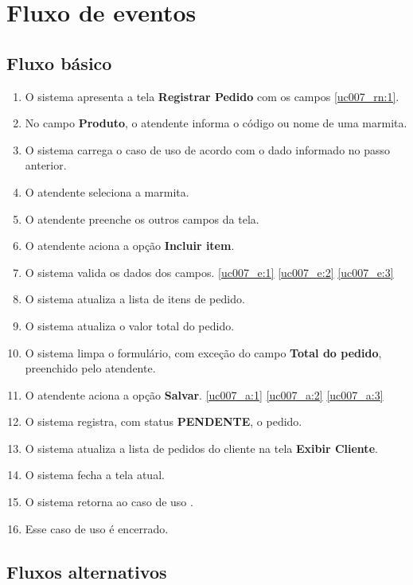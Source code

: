 \section{Fluxo de eventos}

\subsection{Fluxo básico}

\begin{enumerate}[label=P\arabic*]
	\item O sistema apresenta a tela \textbf{Registrar Pedido} com os campos \ref{uc007_rn:1}. \label{uc007_p:1}
	\item No campo \textbf{Produto}, o atendente informa o código ou nome de uma marmita. \label{uc007_p:2}
	\item O sistema carrega o caso de uso  de acordo com o dado informado no passo anterior.
	\item O atendente seleciona a marmita. \label{uc007_p:4}
	\item O atendente preenche os outros campos da tela. \label{uc007_p:5}	
	\item O atendente aciona a opção \textbf{Incluir item}.
	\item O sistema valida os dados dos campos. \ref{uc007_e:1} \ref{uc007_e:2} \ref{uc007_e:3}
	\item O sistema atualiza a lista de itens de pedido.
	\item O sistema atualiza o valor total do pedido.
	\item O sistema limpa o formulário, com exceção do campo \textbf{Total do pedido}, preenchido pelo atendente.
	\item O atendente aciona a opção \textbf{Salvar}. \label{uc007_a:11}\ref{uc007_a:1} \ref{uc007_a:2} \ref{uc007_a:3}
	\item O sistema registra, com status \textbf{PENDENTE}, o pedido.
	\item O sistema atualiza a lista de pedidos do cliente na tela \textbf{Exibir Cliente}.
	\item O sistema fecha a tela atual.
	\item O sistema retorna ao caso de uso .
	\item Esse caso de uso é encerrado.	
\end{enumerate}

\subsection{Fluxos alternativos}

